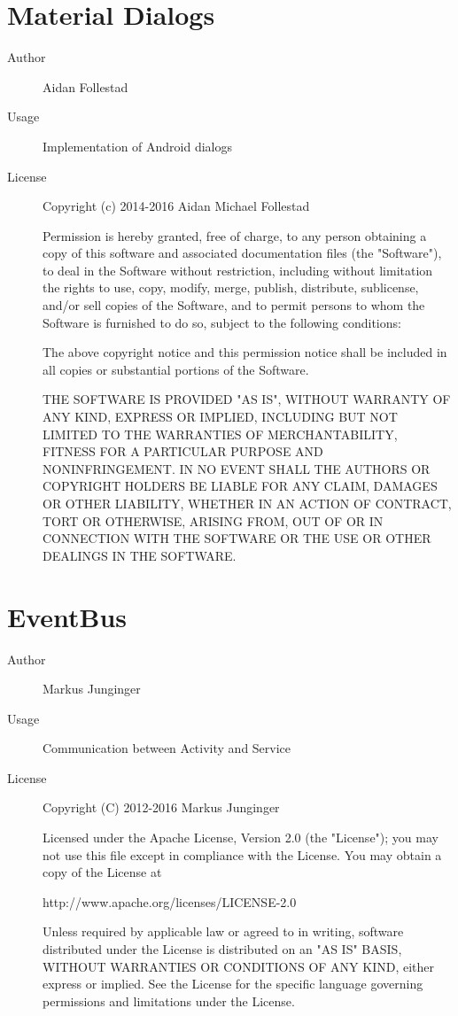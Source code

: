\section*{Material Dialogs}
\begin{description}
    \item[Author] Aidan Follestad
    \item[Usage] Implementation of Android dialogs
    \item[License] \scriptsize Copyright (c) 2014-2016 Aidan Michael Follestad
    
    Permission is hereby granted, free of charge, to any person obtaining a copy
of this software and associated documentation files (the "Software"), to deal
in the Software without restriction, including without limitation the rights
to use, copy, modify, merge, publish, distribute, sublicense, and/or sell
copies of the Software, and to permit persons to whom the Software is
furnished to do so, subject to the following conditions:

The above copyright notice and this permission notice shall be included in all
copies or substantial portions of the Software.

THE SOFTWARE IS PROVIDED "AS IS", WITHOUT WARRANTY OF ANY KIND, EXPRESS OR
IMPLIED, INCLUDING BUT NOT LIMITED TO THE WARRANTIES OF MERCHANTABILITY,
FITNESS FOR A PARTICULAR PURPOSE AND NONINFRINGEMENT. IN NO EVENT SHALL THE
AUTHORS OR COPYRIGHT HOLDERS BE LIABLE FOR ANY CLAIM, DAMAGES OR OTHER
LIABILITY, WHETHER IN AN ACTION OF CONTRACT, TORT OR OTHERWISE, ARISING FROM,
OUT OF OR IN CONNECTION WITH THE SOFTWARE OR THE USE OR OTHER DEALINGS IN THE
SOFTWARE.
    
\end{description}


\section*{EventBus}
\begin{description}
    \item[Author] Markus Junginger
    \item[Usage] Communication between Activity and Service
    \item[License] \scriptsize Copyright (C) 2012-2016 Markus Junginger
    
     Licensed under the Apache License, Version 2.0 (the "License");
   you may not use this file except in compliance with the License.
   You may obtain a copy of the License at

       http://www.apache.org/licenses/LICENSE-2.0

   Unless required by applicable law or agreed to in writing, software
   distributed under the License is distributed on an "AS IS" BASIS,
   WITHOUT WARRANTIES OR CONDITIONS OF ANY KIND, either express or implied.
   See the License for the specific language governing permissions and
   limitations under the License.
\end{description}

